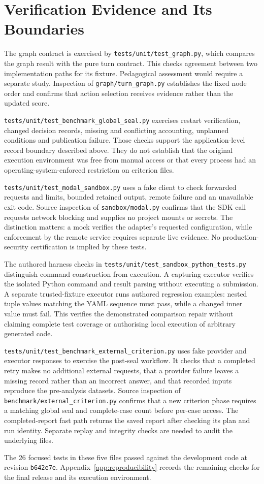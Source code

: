 \section{Verification Evidence and Its Boundaries}

The graph contract is exercised by \texttt{tests/unit/test\_graph.py}, which compares the graph result with the pure turn
contract. This checks agreement between two implementation paths for its fixture. Pedagogical assessment would require a
separate study. Inspection of \texttt{graph/turn\_graph.py} establishes the fixed node order and confirms that action selection
receives evidence rather than the updated score.

\texttt{tests/unit/test\_benchmark\_global\_seal.py} exercises restart verification, changed decision records, missing and
conflicting accounting, unplanned conditions and publication failure. Those checks support the application-level record
boundary described above. They do not establish that the original execution environment was free from manual access or
that every process had an operating-system-enforced restriction on criterion files.

\texttt{tests/unit/test\_modal\_sandbox.py} uses a fake client to check forwarded requests and limits, bounded retained output,
remote failure and an unavailable exit code. Source inspection of \texttt{sandbox/modal.py} confirms that the SDK call requests
network blocking and supplies no project mounts or secrets. The distinction matters: a mock verifies the adapter's requested
configuration, while enforcement by the remote service requires separate live evidence. No production-security certification
is implied by these tests.

The authored harness checks in \texttt{tests/unit/test\_sandbox\_python\_tests.py} distinguish command construction from
execution. A capturing executor verifies the isolated Python command and result parsing without executing a submission.
A separate trusted-fixture executor runs authored regression examples: nested tuple values matching the YAML sequence must
pass, while a changed inner value must fail. This verifies the demonstrated comparison repair without claiming complete test
coverage or authorising local execution of arbitrary generated code.

\texttt{tests/unit/test\_benchmark\_external\_criterion.py} uses fake provider and executor responses to exercise the post-seal
workflow. It checks that a completed retry makes no additional external requests, that a provider failure leaves a missing
record rather than an incorrect answer, and that recorded inputs reproduce the pre-analysis datasets. Source inspection of
\texttt{benchmark/external\_criterion.py} confirms that a new criterion phase requires a matching global seal and complete-case
count before per-case access. The completed-report fast path returns the saved report after checking its plan and run identity.
Separate replay and integrity checks are needed to audit the underlying files.

The 26 focused tests in these five files passed against the development code at revision \texttt{b642e7e}.
Appendix~\ref{app:reproducibility} records the remaining checks for the final release and its execution environment.
